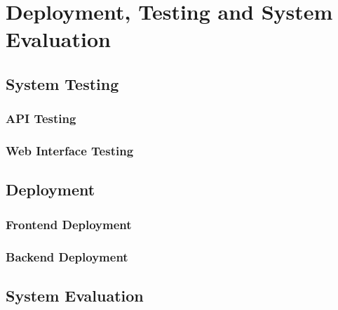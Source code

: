 \chapter{Deployment, Testing and System Evaluation}
\section{System Testing}
\subsection{API Testing}
\subsection{Web Interface Testing}

\section{Deployment}
\subsection{Frontend Deployment}
\subsection{Backend Deployment}

\section{System Evaluation}